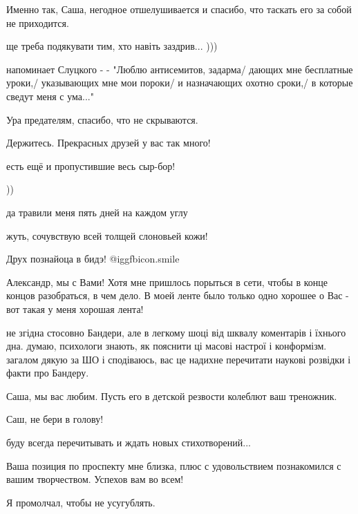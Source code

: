 \begin{itemize}
Именно так, Саша, негодное отшелушивается и спасибо, что таскать его за собой не приходится.

ще треба подякувати тим, хто навіть заздрив... )))


напоминает Слуцкого - - "Люблю антисемитов, задарма/ дающих мне бесплатные
уроки,/ указывающих мне мои пороки/ и назначающих охотно сроки,/ в которые
сведут меня с ума..."

Ура предателям, спасибо, что не скрываются.

Держитесь. Прекрасных друзей у вас так много!


есть ещё и пропустившие весь сыр-бор!

\begin{itemize} %
))

да травили меня пять дней на каждом углу


жуть, сочувствую всей толщей слоновьей кожи!
\end{itemize} %

Друх познайоца в бидэ!  @igg{fbicon.smile} 


Александр, мы с Вами! Хотя мне пришлось порыться в сети, чтобы в конце концов
разобраться, в чем дело. В моей ленте было только одно хорошее о Вас - вот
такая у меня хорошая лента!


не згідна стосовно Бандери, але в легкому шоці від шквалу коментарів і їхнього
дна. думаю, психологи знають, як пояснити ці масові настрої і конформізм.
загалом дякую за ШО і сподіваюсь, вас це надихне перечитати наукові розвідки і
факти про Бандеру.

Саша, мы вас любим. Пусть его в детской резвости колеблют ваш треножник.

Саш, не бери в голову!

буду всегда перечитывать и ждать новых стихотворений...

Ваша позиция по проспекту мне близка, плюс с удовольствием познакомился с вашим
творчеством. Успехов вам во всем!

Я промолчал, чтобы не усугублять.


\end{itemize}
